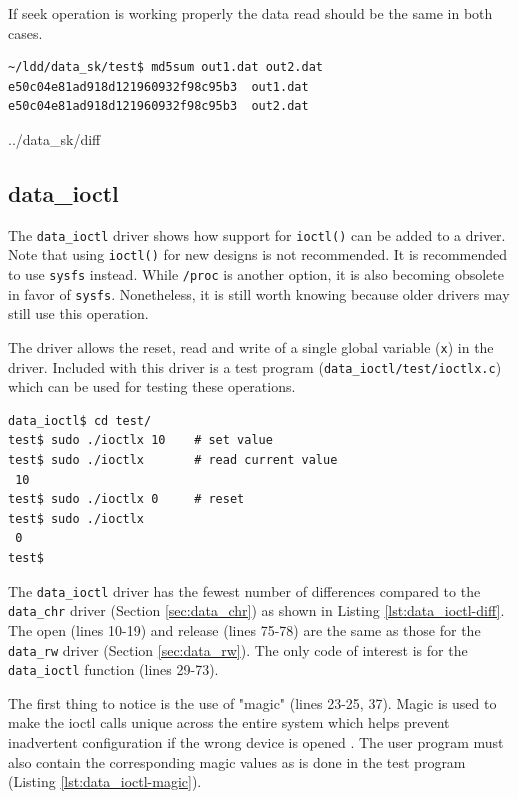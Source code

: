 \documentclass{article}
\begin{document}
If seek operation is working properly the data read should be the same
in both cases.
\begin{verbatim}
~/ldd/data_sk/test$ md5sum out1.dat out2.dat
e50c04e81ad918d121960932f98c95b3  out1.dat
e50c04e81ad918d121960932f98c95b3  out2.dat
\end{verbatim}


	{../data_sk/diff}


\clearpage
\subsection{data\_ioctl}

The \verb+data_ioctl+ driver shows how support for \verb+ioctl()+ can
be added to a driver.
Note that using \verb+ioctl()+ for new designs is not
recommended\autocite[Pg. 156]{corbet2009linux}\autocite{love2010linux}.
It is recommended to use \verb+sysfs+ instead.
While \verb+/proc+ is another option, it is also becoming obsolete in
favor of \verb+sysfs+.
Nonetheless, it is still worth knowing because older drivers may still
use this operation.

The driver allows the reset, read and write of a single global variable
(\verb+x+) in the driver.
Included with this driver is a test program (\verb+data_ioctl/test/ioctlx.c+)
which can be used for testing these operations.

\begin{verbatim}
data_ioctl$ cd test/
test$ sudo ./ioctlx 10    # set value
test$ sudo ./ioctlx       # read current value
 10
test$ sudo ./ioctlx 0     # reset
test$ sudo ./ioctlx
 0
test$
\end{verbatim}

The \verb+data_ioctl+ driver has the fewest number of differences compared to
the \verb+data_chr+ driver (Section \ref{sec:data_chr}) as shown
in Listing \ref{lst:data_ioctl-diff}.
The open (lines 10-19) and release (lines 75-78) are the same as
those for the \verb+data_rw+ driver (Section \ref{sec:data_rw}).
The only code of interest is for the \verb+data_ioctl+ function (lines 29-73).

The first thing to notice is the use of "magic" (lines 23-25, 37).
Magic is used to make the ioctl calls unique across the entire system
which helps prevent inadvertent configuration if the wrong device is opened
\autocite[Pg. 158]{corbet2009linux}.
The user program must also contain the corresponding magic
values as is done in the test program (Listing \ref{lst:data_ioctl-magic}).
\end{document}
